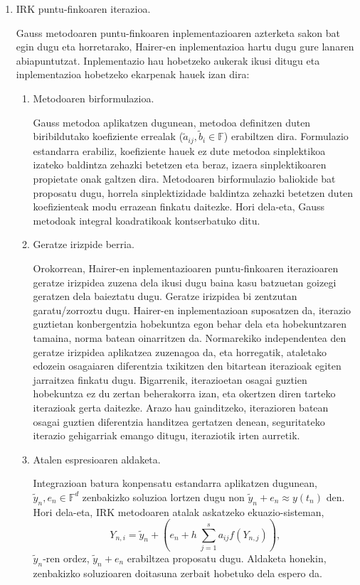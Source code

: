 \begin{enumerate}
\item IRK puntu-finkoaren iterazioa.

Gauss metodoaren puntu-finkoaren inplementazioaren azterketa sakon bat egin dugu eta horretarako, Hairer-en inplementazioa \cite{Hairer2008} hartu dugu gure lanaren abiapuntutzat. Inplementazio hau hobetzeko aukerak ikusi ditugu eta inplementazioa hobetzeko ekarpenak hauek izan dira:  

\begin{enumerate}
\item Metodoaren birformulazioa.

Gauss metodoa aplikatzen dugunean, metodoa definitzen duten biribildutako koefiziente errealak ($\tilde{a}_{ij}, \tilde{b}_i \in \mathbb{F}$) erabiltzen dira. Formulazio estandarra erabiliz, koefiziente hauek ez dute metodoa sinplektikoa izateko baldintza zehazki betetzen eta beraz, izaera sinplektikoaren propietate onak galtzen dira. Metodoaren birformulazio baliokide bat proposatu dugu, horrela sinplektizidade baldintza zehazki betetzen duten koefizienteak modu errazean finkatu daitezke. Hori dela-eta, Gauss metodoak integral koadratikoak kontserbatuko ditu.

\item Geratze irizpide berria.

Orokorrean, Hairer-en inplementazioaren puntu-finkoaren iterazioaren geratze irizpidea zuzena dela ikusi dugu baina kasu batzuetan goizegi geratzen dela baieztatu dugu. Geratze irizpidea bi zentzutan garatu/zorroztu dugu. Hairer-en inplementazioan suposatzen da, iterazio guztietan konbergentzia hobekuntza egon behar dela eta hobekuntzaren tamaina, norma batean oinarritzen da. Normarekiko independentea den geratze irizpidea aplikatzea zuzenagoa da, eta horregatik, ataletako edozein osagaiaren diferentzia txikitzen den bitartean iterazioak egiten jarraitzea finkatu dugu. Bigarrenik, iterazioetan osagai guztien hobekuntza ez du zertan beherakorra izan, eta okertzen diren tarteko iterazioak gerta daitezke. Arazo hau gainditzeko, iterazioren batean osagai guztien diferentzia handitzea gertatzen denean, seguritateko iterazio gehigarriak emango ditugu, iteraziotik irten aurretik.   

\item Atalen espresioaren aldaketa.

Integrazioan batura konpensatu estandarra aplikatzen dugunean, $\tilde{y}_n, e_n \in \mathbb{F}^d$ zenbakizko soluzioa  lortzen dugu non $\tilde{y}_n+e_n \approx y(t_n)$ den. Hori dela-eta, IRK metodoaren atalak askatzeko ekuazio-sisteman,
\begin{equation*}
Y_{n,i}=\tilde{y}_n + \left(e_n+ h \ \sum_{j=1}^{s} a_{ij} f(Y_{n,j}) \right),
\end{equation*}
$\tilde{y}_n$-ren ordez, $\tilde{y}_n+e_n$ erabiltzea proposatu dugu. Aldaketa honekin, zenbakizko soluzioaren doitasuna zerbait hobetuko dela espero da.
 

\end{enumerate}
\end{enumerate}
